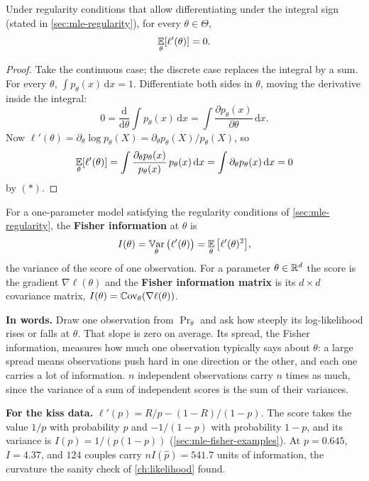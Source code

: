 \begin{proposition}
\label{prop:score-mean}
Under regularity conditions that allow differentiating under the integral sign (stated in \cref{sec:mle-regularity}), for every $\theta \in \Theta$,
\[
\operatorname*{\mathbb{E}}_\theta[\ell'(\theta)] = 0.
\]
\end{proposition}

\begin{proof}
Take the continuous case; the discrete case replaces the integral by a sum.
For every $\theta$, $\int p_\theta(x)\,\mathrm{d}x = 1$.
Differentiate both sides in $\theta$, moving the derivative inside the integral:
\[
0 = \frac{\mathrm{d}}{\mathrm{d}\theta}\int p_\theta(x)\,\mathrm{d}x = \int \frac{\partial p_\theta(x)}{\partial\theta}\,\mathrm{d}x. \tag{$\ast$}
\]
Now $\ell'(\theta) = \partial_\theta \log p_\theta(X) = \partial_\theta p_\theta(X)/p_\theta(X)$, so
\[
\operatorname*{\mathbb{E}}_\theta[\ell'(\theta)] = \int \frac{\partial_\theta p_\theta(x)}{p_\theta(x)}\,p_\theta(x)\,\mathrm{d}x = \int \partial_\theta p_\theta(x)\,\mathrm{d}x = 0
\]
by $(\ast)$.
\end{proof}

\begin{definition}
\label{def:fisher}
For a one-parameter model satisfying the regularity conditions of \cref{sec:mle-regularity}, the \textbf{Fisher information} at $\theta$ is
\[
I(\theta) = \operatorname*{\mathbb{V}\text{ar}}_\theta\big(\ell'(\theta)\big) = \operatorname*{\mathbb{E}}_\theta\big[\ell'(\theta)^2\big],
\]
the variance of the score of one observation.
For a parameter $\theta \in \mathbb{R}^d$ the score is the gradient $\nabla\ell(\theta)$ and the \textbf{Fisher information matrix} is its $d \times d$ covariance matrix, $I(\theta) = \operatorname*{\mathbb{C}\text{ov}}_\theta(\nabla\ell(\theta))$.
\end{definition}

\begin{inwords}
\textbf{In words.} Draw one observation from $\Pr_\theta$ and ask how steeply its log-likelihood rises or falls at $\theta$. That slope is zero on average. Its spread, the Fisher information, measures how much one observation typically says about $\theta$: a large spread means observations push hard in one direction or the other, and each one carries a lot of information. $n$ independent observations carry $n$ times as much, since the variance of a sum of independent scores is the sum of their variances.
\par\smallskip
\textbf{For the kiss data.} $\ell'(p) = R/p - (1 - R)/(1 - p)$. The score takes the value $1/p$ with probability $p$ and $-1/(1-p)$ with probability $1 - p$, and its variance is $I(p) = 1/(p(1 - p))$ (\cref{sec:mle-fisher-examples}). At $p = 0.645$, $I = 4.37$, and $124$ couples carry $nI(\hat{p}) = 541.7$ units of information, the curvature the sanity check of \cref{ch:likelihood} found.
\end{inwords}

